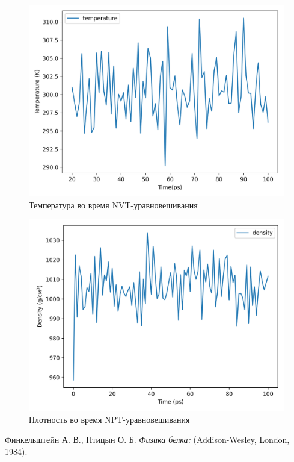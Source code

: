 \documentclass[
11pt,%
tightenlines,%
twoside,%
onecolumn,%
nofloats,%
nobibnotes,%
nofootinbib,%
superscriptaddress,%
noshowpacs,%
centertags]%
{revtex4}
\begin{document}
\begin{figure}[t]
	\centering
	\includegraphics[scale=0.7]{temperature}
	\caption{Температура во время NVT-уравновешивания}
\end{figure}
\begin{figure}[t]
	\centering
	\includegraphics[scale=0.7]{density}
	\caption{Плотность во время NPT-уравновешивания}
\end{figure}

\newpage

%
%

\begin{thebibliography}{99}
Финкельштейн А. В., Птицын О. Б. \emph{Физика белка:} (Addison-Wesley, London, 1984).




\end{thebibliography}
\end{document}
